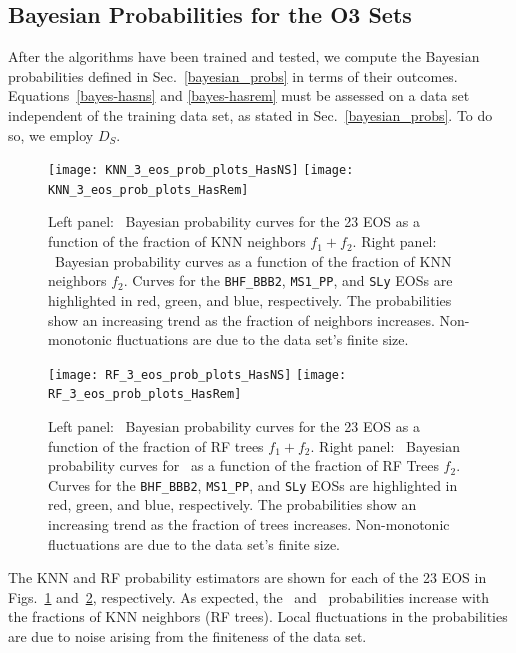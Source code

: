 \subsection{Bayesian Probabilities for the \ac{O3} Sets}

After the algorithms have been trained and tested, we compute the Bayesian probabilities defined in Sec.~\ref{bayesian_probs} in terms of their outcomes. Equations~\eqref{bayes-hasns} and \eqref{bayes-hasrem} must be assessed on a data set independent of the training data set, as stated in Sec.~\ref{bayesian_probs}. To do so, we employ $D_S$.

\begin{figure}%
\texttt{[image: KNN\_3\_eos\_prob\_plots\_HasNS]}
\texttt{[image: KNN\_3\_eos\_prob\_plots\_HasRem]}
\caption{Left panel: \hasns\ Bayesian probability curves for the 23 \ac{EOS} as a function of the fraction of \ac{KNN} neighbors $f_1+f_2$. Right panel: \hasrem\ Bayesian probability curves as a function of the fraction of \ac{KNN} neighbors $f_2$. Curves for the {\tt BHF\_BBB2}, {\tt MS1\_PP}, and {\tt SLy} \ac{EOS}s are highlighted in red, green, and blue, respectively. The probabilities show an increasing trend as the fraction of neighbors increases. Non-monotonic fluctuations are due to the data set's finite size.}
\label{fig:bayesian_prob_fits_KNN}
\end{figure}

\begin{figure}%
\texttt{[image: RF\_3\_eos\_prob\_plots\_HasNS]}
\texttt{[image: RF\_3\_eos\_prob\_plots\_HasRem]}
\caption{Left panel: \hasns\ Bayesian probability curves for the 23 \ac{EOS} as a function of the fraction of \ac{RF} trees $f_1+f_2$. Right panel: \hasrem\ Bayesian probability curves for \hasrem\ as a function of the fraction of \ac{RF} Trees $f_2$. Curves for the {\tt BHF\_BBB2}, {\tt MS1\_PP}, and {\tt SLy} \ac{EOS}s are highlighted in red, green, and blue, respectively. The probabilities show an increasing trend as the fraction of trees increases.  Non-monotonic fluctuations are due to the data set's finite size.}
\label{fig:bayesian_prob_fits_RF}
\end{figure}

The \ac{KNN} and \ac{RF} probability estimators are shown for each of the 23 \ac{EOS} in Figs.~\ref{fig:bayesian_prob_fits_KNN} and~\ref{fig:bayesian_prob_fits_RF}, respectively. As expected, the
\hasns\ and \hasrem\ probabilities increase with the fractions of \ac{KNN} neighbors (\ac{RF} trees). Local fluctuations in the probabilities are due to noise arising from the finiteness of the data
set. 

